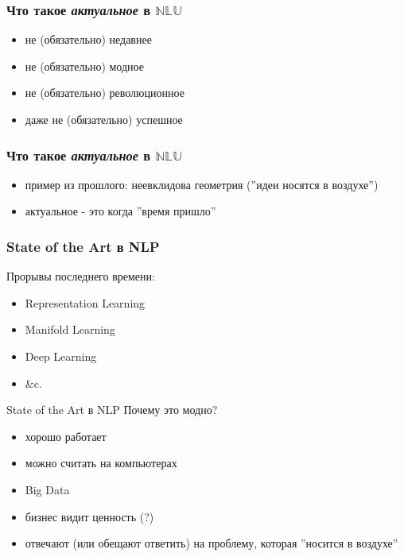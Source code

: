 \documentclass{beamer}
\begin{document}
\begin{frame}[fragile]
\frametitle{Что такое \textit{актуальное} в $\mathbb{NLU}$}
\begin{itemize}
  \item не (обязательно) недавнее
  \item не (обязательно) модное
  \item не (обязательно) революционное
  \item даже не (обязательно) успешное
\end{itemize}
\end{frame}

\begin{frame}[fragile]
\frametitle{Что такое \textit{актуальное} в $\mathbb{NLU}$}
\begin{itemize}
  \item пример из прошлого: неевклидова геометрия (''идеи носятся в воздухе'')
  \item актуальное - это когда ''время пришло''
\end{itemize}
\end{frame}

\begin{frame}[fragile]
\frametitle{State of the Art в NLP}
Прорывы последнего времени:\bigskip
\begin{itemize}
  \item Representation Learning
  \item Manifold Learning
  \item Deep Learning
  \item \&c.
\end{itemize}
\end{frame}

\begin{frame}{State of the Art в NLP}
Почему это модно?\bigskip
\begin{itemize}
  \item хорошо работает
  \item можно считать на компьютерах
  \item Big Data
  \item бизнес видит ценность (?) 
  \item отвечают (или обещают ответить) на проблему, которая ''носится в воздухе'' 
\end{itemize}
\end{frame}
\end{document}
